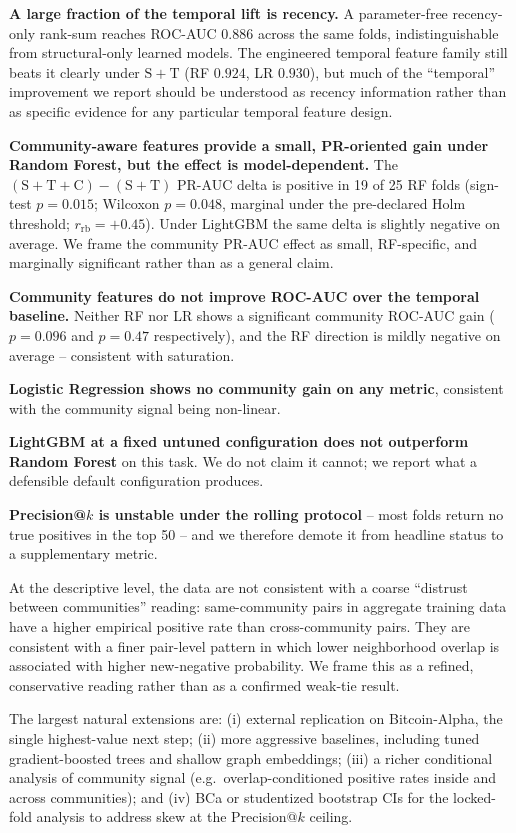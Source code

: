 \documentclass[conference]{IEEEtran}
\begin{document}
\textbf{A large fraction of the temporal lift is recency.} A
parameter-free recency-only rank-sum reaches ROC-AUC $0.886$ across
the same folds, indistinguishable from structural-only learned
models. The engineered temporal feature family still beats it
clearly under $\mathrm{S}{+}\mathrm{T}$ (RF $0.924$, LR $0.930$), but
much of the ``temporal'' improvement we report should be understood
as recency information rather than as specific evidence for any
particular temporal feature design.

\textbf{Community-aware features provide a small, PR-oriented gain
under Random Forest, but the effect is model-dependent.} The
$(\mathrm{S}{+}\mathrm{T}{+}\mathrm{C}) - (\mathrm{S}{+}\mathrm{T})$
PR-AUC delta is positive in 19 of 25 RF folds (sign-test
$p = 0.015$; Wilcoxon $p = 0.048$, marginal under the pre-declared
Holm threshold; $r_{\mathrm{rb}} = +0.45$). Under LightGBM the same
delta is slightly negative on average. We frame the community PR-AUC
effect as small, RF-specific, and marginally significant rather than
as a general claim.

\textbf{Community features do not improve ROC-AUC over the temporal
baseline.} Neither RF nor LR shows a significant community ROC-AUC
gain ($p = 0.096$ and $p = 0.47$ respectively), and the RF
direction is mildly negative on average -- consistent with saturation.

\textbf{Logistic Regression shows no community gain on any metric},
consistent with the community signal being non-linear.

\textbf{LightGBM at a fixed untuned configuration does not outperform
Random Forest} on this task. We do not claim it cannot; we report
what a defensible default configuration produces.

\textbf{Precision@$k$ is unstable under the rolling protocol} --
most folds return no true positives in the top 50 -- and we
therefore demote it from headline status to a supplementary metric.

At the descriptive level, the data are not consistent with a coarse
``distrust between communities'' reading: same-community pairs in
aggregate training data have a higher empirical positive rate than
cross-community pairs. They are consistent with a finer pair-level
pattern in which lower neighborhood overlap is associated with
higher new-negative probability. We frame this as a refined,
conservative reading rather than as a confirmed weak-tie result.

The largest natural extensions are: (i) external replication on
Bitcoin-Alpha, the single highest-value next step; (ii) more
aggressive baselines, including tuned gradient-boosted trees and
shallow graph embeddings; (iii) a richer conditional analysis of
community signal (e.g.\ overlap-conditioned positive rates inside
and across communities); and (iv) BCa or studentized bootstrap CIs
for the locked-fold analysis to address skew at the Precision@$k$
ceiling.
\end{document}
